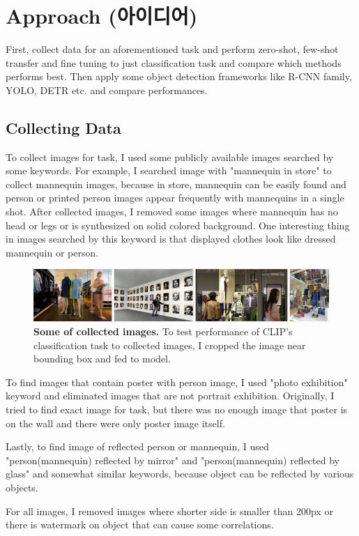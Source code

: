 \documentclass[twocolumn]{article}
\begin{document}
\section{Approach (아이디어)}
First, collect data for an aforementioned task and perform zero-shot, few-shot transfer and fine tuning to just classification task and compare which methods performs best.
Then apply some object detection frameworks like R-CNN family, YOLO, DETR etc. and compare performances.

\subsection{Collecting Data}
To collect images for task, I used some publicly available images searched by some keywords.
For example, I searched image with "mannequin in store" to collect mannequin images, because in store, mannequin can be easily found and person or printed person images appear frequently with mannequins in a single shot.
After collected images, I removed some images where mannequin has no head or legs or is synthesized on solid colored background.
One interesting thing in images searched by this keyword is that displayed clothes look like dressed mannequin or person.

\begin{figure}
    \includegraphics[width=\textwidth]{images/1.jpg}
    \caption{\textbf{Some of collected images.} To test performance of CLIP's classification task to collected images, I cropped the image near bounding box and fed to model.}
\end{figure}

To find images that contain poster with person image, I used "photo exhibition" keyword and eliminated images that are not portrait exhibition.
Originally, I tried to find exact image for task, but there was no enough image that poster is on the wall and there were only poster image itself.

Lastly, to find image of reflected person or mannequin, I used "person(mannequin) reflected by mirror" and "person(mannequin) reflected by glass" and somewhat similar keywords, because object can be reflected by various objects.

For all images, I removed images where shorter side is smaller than 200px or there is watermark on object that can cause some correlations.



\end{document}
